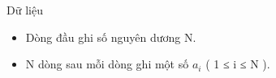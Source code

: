 Dữ liệu  
\begin{itemize}
	\item     Dòng đầu ghi số nguyên dương N.   
	\item     N dòng sau mỗi dòng ghi một số $a_{i}$    ( 1 ≤ i ≤ N ).   
\end{itemize}